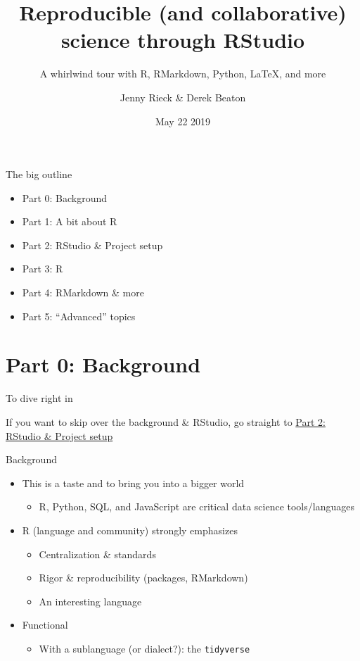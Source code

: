 \documentclass[ignorenonframetext,]{beamer}
\title{Reproducible (and collaborative) science through RStudio}
\subtitle{A whirlwind tour with R, RMarkdown, Python, LaTeX, and more}
\author{Jenny Rieck \& Derek Beaton}
\date{May 22 2019}
\providecommand{\tightlist}{%
  \setlength{\itemsep}{0pt}\setlength{\parskip}{0pt}}
\begin{document}
\frame{\titlepage}

\begin{frame}{The big outline}
\protect\hypertarget{the-big-outline}{}

\begin{itemize}
\tightlist
\item
  Part 0: Background
\item
  Part 1: A bit about R
\item
  Part 2: RStudio \& Project setup
\item
  Part 3: R
\item
  Part 4: RMarkdown \& more
\item
  Part 5: ``Advanced'' topics
\end{itemize}

\end{frame}

\hypertarget{part-0-background}{%
\section{Part 0: Background}\label{part-0-background}}

\begin{frame}{To dive right in}
\protect\hypertarget{to-dive-right-in}{}

If you want to skip over the background \& RStudio, go straight to
\protect\hyperlink{part-2-rstudio-project-setup}{Part 2: RStudio \&
Project setup}

\end{frame}

\begin{frame}[fragile]{Background}
\protect\hypertarget{background}{}

\begin{itemize}
\tightlist
\item
  This is a taste and to bring you into a bigger world

  \begin{itemize}
  \tightlist
  \item
    R, Python, SQL, and JavaScript are critical data science
    tools/languages
  \end{itemize}
\item
  R (language and community) strongly emphasizes

  \begin{itemize}
  \tightlist
  \item
    Centralization \& standards
  \item
    Rigor \& reproducibility (packages, RMarkdown)
  \item
    An interesting language
  \end{itemize}
\item
  Functional

  \begin{itemize}
  \tightlist
  \item
    With a sublanguage (or dialect?): the \texttt{tidyverse}
  \end{itemize}
\end{itemize}

\end{frame}
\end{document}
